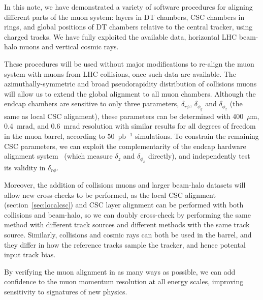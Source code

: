 In this note, we have demonstrated a variety of software procedures for
aligning different parts of the muon system: layers in DT chambers,
CSC chambers in rings, and global positions of DT chambers relative to
the central tracker, using charged tracks.  We have fully exploited the available data,
horizontal LHC beam-halo muons and vertical cosmic rays.

These procedures will be used without major modifications to re-align
the muon system with muons from LHC collisions, once such data are
available.  The azimuthally-symmetric and broad pseudorapidity
distribution of collisions muons will allow us to extend the global
alignment to all muon chambers.  Although the endcap chambers are
sensitive to only three parameters, $\delta_{r\phi}$,
$\delta_{\phi_y}$ and $\delta_{\phi_z}$ (the same as local CSC
alignment), these parameters can be determined with 400~$\mu$m,
0.4~mrad, and 0.6~mrad resolution with similar results for all degrees
of freedom in the muon barrel, according to 50~pb$^{-1}$ simulations.
To constrain the remaining CSC parameters, we can exploit the
complementarity of the endcap hardware alignment
system~\cite{ref:hardware_alignment} (which measure $\delta_z$ and
$\delta_{\phi_x}$ directly), and independently test its validity in
$\delta_{r\phi}$.

Moreover, the addition of collisions muons and larger beam-halo
datasets will allow new cross-checks to be performed, as the local CSC
alignment (section~\ref{sec:localcsc}) and CSC layer alignment can be
performed with both collisions and beam-halo, so we can doubly
cross-check by performing the same method with different track sources
and different methods with the same track source.  Similarly,
collisions and cosmic rays can both be used in the barrel, and they
differ in how the reference tracks sample the tracker, and hence
potental input track bias.

By verifying the muon alignment in as many ways as possible, we can
add confidence to the muon momentum resolution at all energy scales,
improving sensitivity to signatures of new physics.
